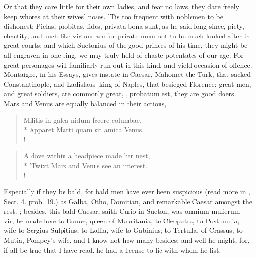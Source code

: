 Or that they care little for their own ladies, and fear no laws, they
dare freely keep whores at their wives' noses. 'Tis too frequent with
noblemen to be dishonest; Pielas, probitas, fides, privata bona sunt,
as he said long since, piety, chastity, and such like virtues are
for private men: not to be much looked after in great courts: and which
Suetonius of the good princes of his time, they might be all engraven
in one ring, we may truly hold of chaste potentates of our age. For
great personages will familiarly run out in this kind, and yield
occasion of offence.  Montaigne, in his Essays, gives instate in
Caesar, Mahomet the Turk, that sacked Constantinople, and Ladislaus,
king of Naples, that besieged Florence: great men, and great soldiers,
are commonly great, \etc{}, probatum est, they are good doers. Mars and
Venus are equally balanced in their actions,
%
\begin{latin}
\begin{verse}%
Militis in galea nidum fecere columbae,\\*
Apparet Marti quam sit amica Venus.\\!
\end{verse}%
\end{latin}
\translationrule%
\begin{verse}%
A dove within a headpiece made her nest,\\*
'Twixt Mars and Venus see an interest.\\!
\end{verse}%
%

Especially if they be bald, for bald men have ever been suspicious
(read more in \Aristotle, Sect. 4. prob. 19.) as Galba, Otho, Domitian,
and remarkable Caesar amongst the rest. ; besides, this bald Caesar, saith Curio in
Sueton, was omnium mulierum vir; he made love to Eunoe, queen of
Mauritania; to Cleopatra; to Posthumia, wife to Sergius Sulpitius; to
Lollia, wife to Gabinius; to Tertulla, of Crassus; to Mutia, Pompey's
wife, and I know not how many besides: and well he might, for, if all
be true that I have read, he had a license to lie with whom he list.

